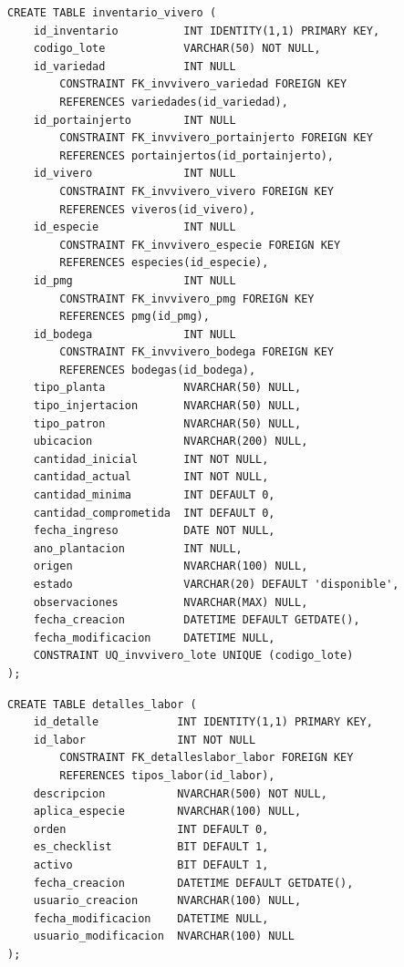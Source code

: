 \documentclass[12pt,a4paper,twoside]{report}
\begin{document}
\begin{lstlisting}[style=sqlstyle, caption={inventario\_vivero}]
CREATE TABLE inventario_vivero (
    id_inventario          INT IDENTITY(1,1) PRIMARY KEY,
    codigo_lote            VARCHAR(50) NOT NULL,
    id_variedad            INT NULL
        CONSTRAINT FK_invvivero_variedad FOREIGN KEY
        REFERENCES variedades(id_variedad),
    id_portainjerto        INT NULL
        CONSTRAINT FK_invvivero_portainjerto FOREIGN KEY
        REFERENCES portainjertos(id_portainjerto),
    id_vivero              INT NULL
        CONSTRAINT FK_invvivero_vivero FOREIGN KEY
        REFERENCES viveros(id_vivero),
    id_especie             INT NULL
        CONSTRAINT FK_invvivero_especie FOREIGN KEY
        REFERENCES especies(id_especie),
    id_pmg                 INT NULL
        CONSTRAINT FK_invvivero_pmg FOREIGN KEY
        REFERENCES pmg(id_pmg),
    id_bodega              INT NULL
        CONSTRAINT FK_invvivero_bodega FOREIGN KEY
        REFERENCES bodegas(id_bodega),
    tipo_planta            NVARCHAR(50) NULL,
    tipo_injertacion       NVARCHAR(50) NULL,
    tipo_patron            NVARCHAR(50) NULL,
    ubicacion              NVARCHAR(200) NULL,
    cantidad_inicial       INT NOT NULL,
    cantidad_actual        INT NOT NULL,
    cantidad_minima        INT DEFAULT 0,
    cantidad_comprometida  INT DEFAULT 0,
    fecha_ingreso          DATE NOT NULL,
    ano_plantacion         INT NULL,
    origen                 NVARCHAR(100) NULL,
    estado                 VARCHAR(20) DEFAULT 'disponible',
    observaciones          NVARCHAR(MAX) NULL,
    fecha_creacion         DATETIME DEFAULT GETDATE(),
    fecha_modificacion     DATETIME NULL,
    CONSTRAINT UQ_invvivero_lote UNIQUE (codigo_lote)
);
\end{lstlisting}

\begin{lstlisting}[style=sqlstyle, caption={detalles\_labor}]
CREATE TABLE detalles_labor (
    id_detalle            INT IDENTITY(1,1) PRIMARY KEY,
    id_labor              INT NOT NULL
        CONSTRAINT FK_detalleslabor_labor FOREIGN KEY
        REFERENCES tipos_labor(id_labor),
    descripcion           NVARCHAR(500) NOT NULL,
    aplica_especie        NVARCHAR(100) NULL,
    orden                 INT DEFAULT 0,
    es_checklist          BIT DEFAULT 1,
    activo                BIT DEFAULT 1,
    fecha_creacion        DATETIME DEFAULT GETDATE(),
    usuario_creacion      NVARCHAR(100) NULL,
    fecha_modificacion    DATETIME NULL,
    usuario_modificacion  NVARCHAR(100) NULL
);
\end{lstlisting}
\end{document}
